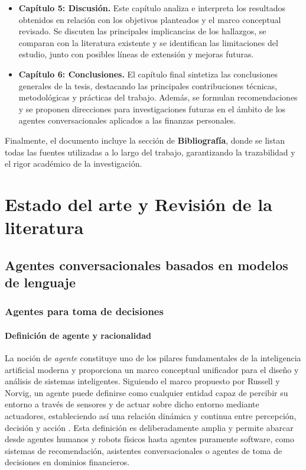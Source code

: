 \documentclass[
	spanish, %
	letterpaper, oneside
]{book}
\begin{document}
\begin{itemize}
    \item \textbf{Capítulo 5: Discusión.}  
    Este capítulo analiza e interpreta los resultados obtenidos en relación con los objetivos planteados y el marco conceptual revisado. Se discuten las principales implicancias de los hallazgos, se comparan con la literatura existente y se identifican las limitaciones del estudio, junto con posibles líneas de extensión y mejoras futuras.

    \item \textbf{Capítulo 6: Conclusiones.}  
    El capítulo final sintetiza las conclusiones generales de la tesis, destacando las principales contribuciones técnicas, metodológicas y prácticas del trabajo. Además, se formulan recomendaciones y se proponen direcciones para investigaciones futuras en el ámbito de los agentes conversacionales aplicados a las finanzas personales.
\end{itemize}

Finalmente, el documento incluye la sección de \textbf{Bibliografía}, donde se listan todas las fuentes utilizadas a lo largo del trabajo, garantizando la trazabilidad y el rigor académico de la investigación.







\chapter{Estado del arte y Revisión de la literatura}

\section{Agentes conversacionales basados en modelos de lenguaje}

\subsection{Agentes para toma de decisiones}

\subsubsection{Definición de agente y racionalidad}

La noción de \emph{agente} constituye uno de los pilares fundamentales de la inteligencia artificial moderna y proporciona un marco conceptual unificador para el diseño y análisis de sistemas inteligentes. 
Siguiendo el marco propuesto por Russell y Norvig, un agente puede definirse como cualquier entidad capaz de percibir su entorno a través de sensores y de actuar sobre dicho entorno mediante actuadores, estableciendo así una relación dinámica y continua entre percepción, decisión y acción \cite{russell2010aima}. Esta definición es deliberadamente amplia y permite abarcar desde agentes humanos y robots físicos hasta agentes puramente software, como sistemas de recomendación, asistentes conversacionales o agentes de toma de decisiones en dominios financieros.
\end{document}
